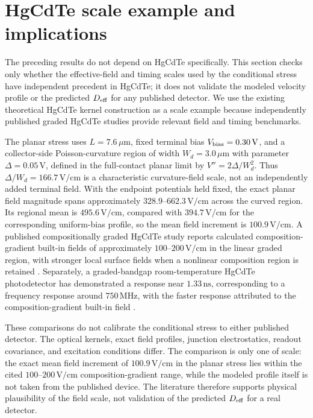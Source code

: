 \documentclass[aps,pra,twocolumn,superscriptaddress,nofootinbib]{revtex4-2}
\begin{document}
\section{HgCdTe scale example and implications}
\label{sec:hgcdte}

The preceding results do not depend on HgCdTe specifically.  This section checks only whether the effective-field and timing scales used by the conditional stress have independent precedent in HgCdTe; it does not validate the modeled velocity profile or the predicted $D_{\rm eff}$ for any published detector.  We use the existing theoretical HgCdTe kernel construction as a scale example because independently published graded HgCdTe studies provide relevant field and timing benchmarks.

The planar stress uses $L=7.6\,\mu\mathrm{m}$, fixed terminal bias $V_{\rm bias}=0.30\,\mathrm{V}$, and a collector-side Poisson-curvature region of width $W_d=3.0\,\mu\mathrm{m}$ with parameter $\Delta=0.05\,\mathrm{V}$, defined in the full-contact planar limit by $V''=2\Delta/W_d^2$.  Thus $\Delta/W_d=166.7\,\mathrm{V/cm}$ is a characteristic curvature-field scale, not an independently added terminal field.  With the endpoint potentials held fixed, the exact planar field magnitude spans approximately $328.9$--$662.3\,\mathrm{V/cm}$ across the curved region.  Its regional mean is $495.6\,\mathrm{V/cm}$, compared with $394.7\,\mathrm{V/cm}$ for the corresponding uniform-bias profile, so the mean field increment is $100.9\,\mathrm{V/cm}$. A published compositionally graded HgCdTe study reports calculated composition-gradient built-in fields of approximately $100$--$200\,\mathrm{V/cm}$ in the linear graded region, with stronger local surface fields when a nonlinear composition region is retained \cite{xu2023graded}. Separately, a graded-bandgap room-temperature HgCdTe photodetector has demonstrated a response near $1.33\,\mathrm{ns}$, corresponding to a frequency response around $750\,\mathrm{MHz}$, with the faster response attributed to the composition-gradient built-in field \cite{sang2022graded}.

These comparisons do not calibrate the conditional stress to either published detector. The optical kernels, exact field profiles, junction electrostatics, readout covariance, and excitation conditions differ.  The comparison is only one of scale: the exact mean field increment of $100.9\,\mathrm{V/cm}$ in the planar stress lies within the cited $100$--$200\,\mathrm{V/cm}$ composition-gradient range, while the modeled profile itself is not taken from the published device.  The literature therefore supports physical plausibility of the field scale, not validation of the predicted $D_{\rm eff}$ for a real detector.
\end{document}
